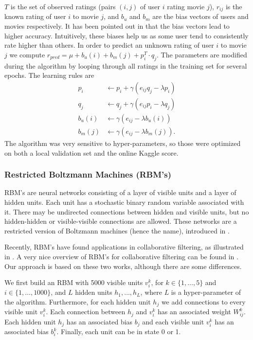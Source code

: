 \documentclass[10pt,conference,compsocconf]{IEEEtran}
\begin{document}
	$T$ is the set of observed ratings (pairs $(i,j)$ of user $i$ rating movie $j$), $r_{ij}$ is the known rating of user $i$ to movie $j$, and $b_u$ and $b_m$ are the bias vectors of users and movies respectively. It has been pointed out in \cite{Koren09matrixfactorization} that the bias vectors lead to higher accuracy. Intuitively, these biases help us as some user tend to consistently rate higher than others. In order to predict an unknown rating of user $i$ to movie $j$ we compute $r_{pred} = \mu + b_u(i) + b_m(j) + p_i^T\cdot q_j$.
	The parameters are modified during the algorithm by looping through all ratings in the training set for several epochs. The learning rules are
	\begin{equation}
	\begin{split}
	p_i &\leftarrow p_i + \gamma(e_{ij}q_j - \lambda p_i) \\
	q_j &\leftarrow q_j + \gamma(e_{ij}p_i - \lambda q_j) \\
	b_u(i) &\leftarrow \gamma(e_{ij} - \lambda b_u(i)) \\
	b_m(j) &\leftarrow \gamma(e_{ij} - \lambda b_m(j)).
	\end{split}
	\end{equation}
	The algorithm was very sensitive to hyper-parameters, so those were optimized on both a local validation set and the online Kaggle score.
	
	\subsubsection*{\textbf{Restricted Boltzmann Machines (RBM's)}}
	
	RBM's are neural networks consisting of a layer of visible units and a layer of hidden units. Each unit has a stochastic binary random variable associated with it. There may be undirected connections between hidden and visible units, but no hidden-hidden or visible-visible connections are allowed. These networks are a restricted version of Boltzmann machines (hence the name), introduced in \cite{AHS85}.
	
	Recently, RBM's have found applications in collaborative filtering, as illustrated in \cite{SMH07}. A very nice overview of RBM's for collaborative filtering can be found in \cite{L10}. Our approach is based on these two works, although there are some differences.
	
	We first build an RBM with 5000 visible units $v^k_i$, for $k\in\{1,\dots,5\}$ and $i\in\{1,\dots,1000\}$, and $L$ hidden units $h_1,\dots, h_L$, where $L$ is a hyper-parameter of the algorithm. Furthermore, for each hidden unit $h_j$ we add connections to every visible unit $v^k_i$. Each connection between $h_j$ and $v^k_i$ has an associated weight $W^k_{ij}$. Each hidden unit $h_j$ has an associated bias $b_j$ and each visible unit $v^k_i$ has an associated bias $b^k_i$. Finally, each unit can be in state 0 or 1.
	
\end{document}
